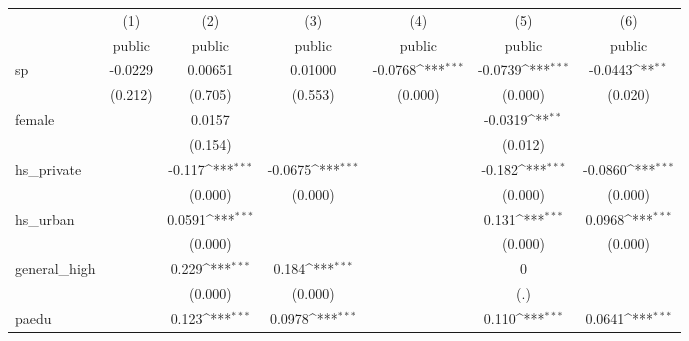 {
\def\sym#1{\ifmmode^{#1}\else\(^{#1}\)\fi}
\begin{tabular}{l*{6}{c}}
\hline\hline
            &\multicolumn{1}{c}{(1)}&\multicolumn{1}{c}{(2)}&\multicolumn{1}{c}{(3)}&\multicolumn{1}{c}{(4)}&\multicolumn{1}{c}{(5)}&\multicolumn{1}{c}{(6)}\\
            &\multicolumn{1}{c}{public}&\multicolumn{1}{c}{public}&\multicolumn{1}{c}{public}&\multicolumn{1}{c}{public}&\multicolumn{1}{c}{public}&\multicolumn{1}{c}{public}\\
\hline
sp          &     -0.0229         &     0.00651         &     0.01000         &     -0.0768\sym{***}&     -0.0739\sym{***}&     -0.0443\sym{**} \\
            &     (0.212)         &     (0.705)         &     (0.553)         &     (0.000)         &     (0.000)         &     (0.020)         \\
[1em]
female      &                     &      0.0157         &                     &                     &     -0.0319\sym{**} &                     \\
            &                     &     (0.154)         &                     &                     &     (0.012)         &                     \\
[1em]
hs\_private  &                     &      -0.117\sym{***}&     -0.0675\sym{***}&                     &      -0.182\sym{***}&     -0.0860\sym{***}\\
            &                     &     (0.000)         &     (0.000)         &                     &     (0.000)         &     (0.000)         \\
[1em]
hs\_urban    &                     &      0.0591\sym{***}&                     &                     &       0.131\sym{***}&      0.0968\sym{***}\\
            &                     &     (0.000)         &                     &                     &     (0.000)         &     (0.000)         \\
[1em]
general\_high&                     &       0.229\sym{***}&       0.184\sym{***}&                     &           0         &                     \\
            &                     &     (0.000)         &     (0.000)         &                     &         (.)         &                     \\
[1em]
paedu       &                     &       0.123\sym{***}&      0.0978\sym{***}&                     &       0.110\sym{***}&      0.0641\sym{***}\\

\end{tabular}}
